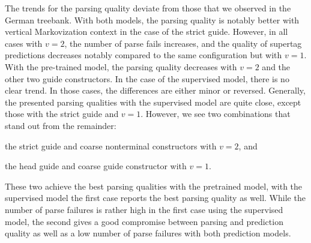 \documentclass[../../document.tex]{subfiles}
\begin{document}
    The trends for the parsing quality deviate from those that we observed in the German \negra{} treebank.
    With both models, the parsing quality is notably better with vertical Markovization context in the case of the strict guide.
    However, in all cases with $v=2$, the number of parse fails increases, and the quality of supertag predictions decreases notably compared to the same configuration but with $v=1$.
    With the pre-trained model, the parsing quality decreases with $v=2$ and the other two guide constructors.
    In the case of the supervised model, there is no clear trend. In those cases, the differences are either minor or reversed.
    Generally, the presented parsing qualities with the supervised model are quite close, except those with the strict guide and $v=1$.
    However, we see two combinations that stand out from the remainder:
    \begin{compactitem}
        \item the strict guide and coarse nonterminal constructors with $v=2$, and
        \item the head guide and coarse guide constructor with $v=1$.
    \end{compactitem}
    These two achieve the best parsing qualities with the pretrained model, with the supervised model the first case reports the best parsing quality as well.
    While the number of parse failures is rather high in the first case using the supervised model, the second gives a good compromise between parsing and prediction quality as well as a low number of parse failures with both prediction models.
\end{document}
